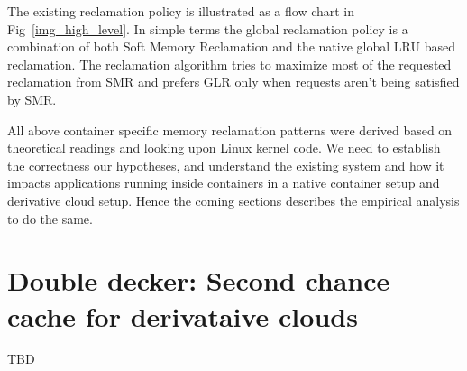       The existing reclamation policy is illustrated as a flow chart in Fig~\ref{img_high_level}. In simple terms the global reclamation 
policy is a combination of both Soft Memory Reclamation and the native global LRU based reclamation. The reclamation algorithm tries to 
maximize most of the requested reclamation from SMR and prefers GLR only when requests aren't being satisfied by SMR.

      All above container specific memory reclamation patterns were derived based on theoretical readings and looking upon Linux kernel 
code. We need to establish the correctness our hypotheses, and understand the existing system and how it impacts applications running 
inside containers in a native container setup and derivative cloud setup. Hence the coming sections describes the empirical analysis to 
do the same.
      
  
  \section{Double decker: Second chance cache for derivataive clouds}
  
    TBD
  
      

      